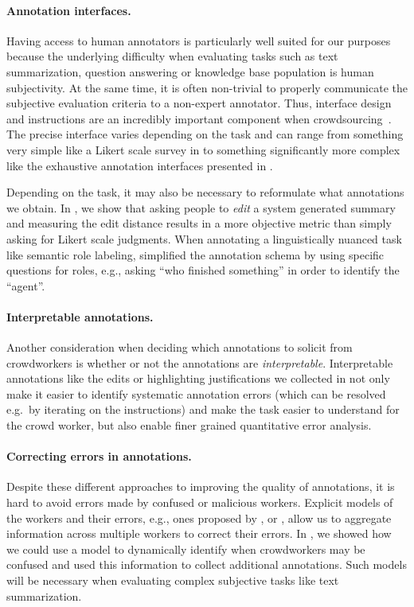 \paragraph{Annotation interfaces.}
Having access to human annotators is particularly well suited for our purposes because the underlying difficulty when evaluating tasks such as text summarization, question answering or knowledge base population is human subjectivity.
At the same time, it is often non-trivial to properly communicate the subjective evaluation criteria to a non-expert annotator.
Thus, interface design and instructions are an incredibly important component when crowdsourcing~\citep{}.
The precise interface varies depending on the task and can range from something very simple like a Likert scale survey in  to something significantly more complex like the exhaustive annotation interfaces presented in .

Depending on the task, it may also be necessary to reformulate what annotations we obtain.
In , we show that asking people to \textit{edit} a system generated summary and measuring the edit distance results in a more objective metric than simply asking for Likert scale judgments.
When annotating a linguistically nuanced task like semantic role labeling, \citet{} simplified the annotation schema by using specific questions for roles, e.g., asking ``who finished something'' in order to identify the ``agent''.

\paragraph{Interpretable annotations.}
Another consideration when deciding which annotations to solicit from crowdworkers is whether or not the annotations are \textit{interpretable}.
Interpretable annotations like the edits or highlighting justifications we collected in  not only make it easier to identify systematic annotation errors (which can be resolved e.g.\ by iterating on the instructions) and make the task easier to understand for the crowd worker, but also enable finer grained quantitative error analysis.

\paragraph{Correcting errors in annotations.}
Despite these different approaches to improving the quality of annotations, it is hard to avoid errors made by confused or malicious workers.
Explicit models of the workers and their errors, e.g., ones proposed by \citet{dawid1950something}, \citet{passeneau2014benefits} or \citet{}, allow us to aggregate information across multiple workers to correct their errors.
In , we showed how we could use a model to dynamically identify when crowdworkers may be confused and used this information to collect additional annotations.
Such models will be necessary when evaluating complex subjective tasks like text summarization.

